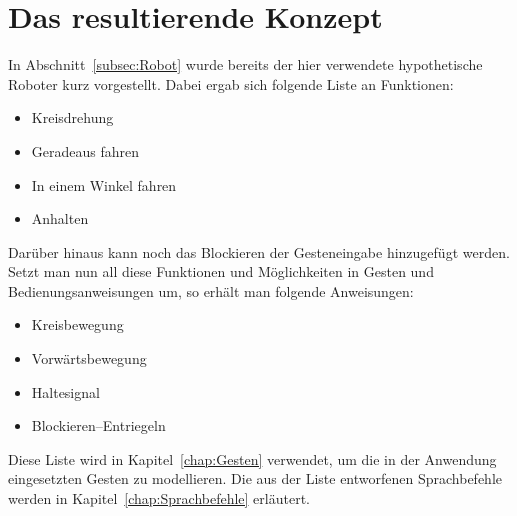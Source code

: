 \section{Das resultierende Konzept}
\label{subsec:Konzept}
In Abschnitt~\ref{subsec:Robot} wurde bereits der hier verwendete hypothetische Roboter kurz vorgestellt. Dabei ergab sich folgende Liste an Funktionen:
\begin{itemize}
\item Kreisdrehung
\item Geradeaus fahren
\item In einem Winkel fahren
\item Anhalten
\end{itemize}
Dar\"uber hinaus kann noch das Blockieren der Gesteneingabe hinzugef\"ugt werden. Setzt man nun all diese Funktionen und M\"oglichkeiten in Gesten und Bedienungsanweisungen um, so erh\"alt man folgende Anweisungen:
\begin{itemize}
\item Kreisbewegung
\item Vorw\"artsbewegung
\item Haltesignal
\item Blockieren--Entriegeln
\end{itemize}
Diese Liste wird in Kapitel~\ref{chap:Gesten} verwendet, um die in der Anwendung eingesetzten Gesten zu modellieren.
\newline
Die aus der Liste entworfenen Sprachbefehle werden in Kapitel~\ref{chap:Sprachbefehle} erl\"autert.